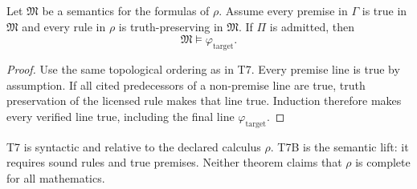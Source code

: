\begin{theorem}
Let $\mathfrak M$ be a semantics for the formulas of $\rho$. Assume every premise in $\Gamma$ is true in $\mathfrak M$ and every rule in $\rho$ is truth-preserving in $\mathfrak M$. If $\Pi$ is admitted, then
\[
\mathfrak M\models\varphi_{\mathrm{target}}.
\]
\end{theorem}

\begin{proof}
Use the same topological ordering as in T7. Every premise line is true by assumption. If all cited predecessors of a non-premise line are true, truth preservation of the licensed rule makes that line true. Induction therefore makes every verified line true, including the final line $\varphi_{\mathrm{target}}$.
\end{proof}

\begin{remark}
T7 is syntactic and relative to the declared calculus $\rho$. T7B is the semantic lift: it requires sound rules and true premises. Neither theorem claims that $\rho$ is complete for all mathematics.
\end{remark}
